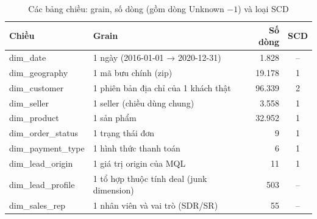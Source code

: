 \begin{table}[htbp]
\centering\small
\caption{Các bảng chiều: grain, số dòng (gồm dòng Unknown $-1$) và loại SCD}
\label{tab:dims}
\begin{tabular}{llrc}
\toprule
\textbf{Chiều} & \textbf{Grain} & \textbf{Số dòng} & \textbf{SCD} \\
\midrule
dim\_date & 1 ngày (2016-01-01 → 2020-12-31) & 1.828 & -- \\
dim\_geography & 1 mã bưu chính (zip) & 19.178 & 1 \\
dim\_customer & 1 phiên bản địa chỉ của 1 khách thật & 96.339 & 2 \\
dim\_seller & 1 seller (chiều dùng chung) & 3.558 & 1 \\
dim\_product & 1 sản phẩm & 32.952 & 1 \\
dim\_order\_status & 1 trạng thái đơn & 9 & 1 \\
dim\_payment\_type & 1 hình thức thanh toán & 6 & 1 \\
dim\_lead\_origin & 1 giá trị origin của MQL & 11 & 1 \\
dim\_lead\_profile & 1 tổ hợp thuộc tính deal (junk dimension) & 503 & -- \\
dim\_sales\_rep & 1 nhân viên và vai trò (SDR/SR) & 55 & -- \\
\bottomrule
\end{tabular}
\end{table}

